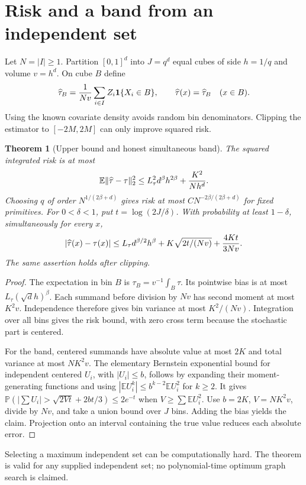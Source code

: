 \documentclass[11pt,a4paper]{article}
\newtheorem{theorem}{Theorem}[section]
\theoremstyle{definition}
\theoremstyle{remark}
\newcommand{\E}{\mathbb{E}}
\newcommand{\Prob}{\mathbb{P}}
\newcommand{\ind}{\mathbf{1}}
\begin{document}
\section{Risk and a band from an independent set}
Let $N=|I|\ge1$. Partition $[0,1]^d$ into $J=q^d$ equal cubes of side $h=1/q$ and volume $v=h^d$. On cube $B$ define
\[
 \widehat\tau_B={1\over Nv}\sum_{i\in I}Z_i\ind\{X_i\in B\},
 \qquad \widehat\tau(x)=\widehat\tau_B\quad(x\in B).
\]
Using the known covariate density avoids random bin denominators. Clipping the estimator to $[-2M,2M]$ can only improve squared risk.
\begin{theorem}[Upper bound and honest simultaneous band]
The squared integrated risk is at most
\[
 \E\|\widehat\tau-\tau\|_2^2
 \le L_\tau^2 d^\beta h^{2\beta}+{K^2\over Nh^d}.
\]
Choosing $q$ of order $N^{1/(2\beta+d)}$ gives risk at most $C N^{-2\beta/(2\beta+d)}$ for fixed primitives. For $0<\delta<1$, put $t=\log(2J/\delta)$. With probability at least $1-\delta$, simultaneously for every $x$,
\[
 |\widehat\tau(x)-\tau(x)|\le
 L_\tau d^{\beta/2}h^\beta+
 K\sqrt{2t/(Nv)}+{4Kt\over3Nv}.
\]
The same assertion holds after clipping.
\end{theorem}
\begin{proof}
The expectation in bin $B$ is $\tau_B=v^{-1}\int_B\tau$. Its pointwise bias is at most $L_\tau(\sqrt d h)^\beta$. Each summand before division by $Nv$ has second moment at most $K^2v$. Independence therefore gives bin variance at most $K^2/(Nv)$. Integration over all bins gives the risk bound, with zero cross term because the stochastic part is centered.

For the band, centered summands have absolute value at most $2K$ and total variance at most $NK^2v$. The elementary Bernstein exponential bound for independent centered $U_i$, with $|U_i|\le b$, follows by expanding their moment-generating functions and using $|\E U_i^k|\le b^{k-2}\E U_i^2$ for $k\ge2$. It gives
$\Prob(|\sum U_i|>\sqrt{2Vt}+2bt/3)\le2e^{-t}$ when $V\ge\sum\E U_i^2$.
Use $b=2K$, $V=NK^2v$, divide by $Nv$, and take a union bound over $J$ bins. Adding the bias yields the claim. Projection onto an interval containing the true value reduces each absolute error.
\end{proof}
Selecting a maximum independent set can be computationally hard. The theorem is valid for any supplied independent set; no polynomial-time optimum graph search is claimed.
\end{document}
